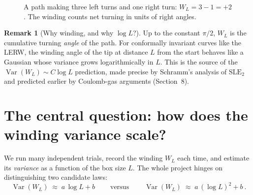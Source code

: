 \documentclass[11pt]{article}
\theoremstyle{definition}
\newtheorem{remark}{Remark}[section]
\theoremstyle{plain}
\newcommand{\Var}{\operatorname{Var}}
\newcommand{\Wind}{W_{L}}
\begin{document}
\begin{figure}[h]
\centering
{}
\caption{A path making three left turns and one right turn:
$\Wind=3-1=+2$. The winding counts net turning in units of right angles.}
\label{fig:wind-path}
\end{figure}

\begin{remark}[Why winding, and why $\log L$?]
Up to the constant $\pi/2$, $\Wind$ is the cumulative turning \emph{angle} of
the path. For conformally invariant curves like the LERW, the winding angle of
the tip at distance $L$ from the start behaves like a Gaussian whose variance
grows logarithmically in $L$. This is the source of the
$\Var(\Wind)\sim C\log L$ prediction, made precise by Schramm's analysis of
$\mathrm{SLE}_2$ and predicted earlier by Coulomb-gas arguments
(Section~8).
\end{remark}

\section{The central question: how does the winding variance scale?}

We run many independent trials, record the winding $\Wind$ each time, and
estimate its \emph{variance} as a function of the box size $L$. The whole
project hinges on distinguishing two candidate laws:
\[
  \boxed{\ \Var(\Wind)\;\approx\; a\,\log L + b\ }
  \qquad\text{versus}\qquad
  \boxed{\ \Var(\Wind)\;\approx\; a\,(\log L)^2 + b\ }.
\]
\end{document}

